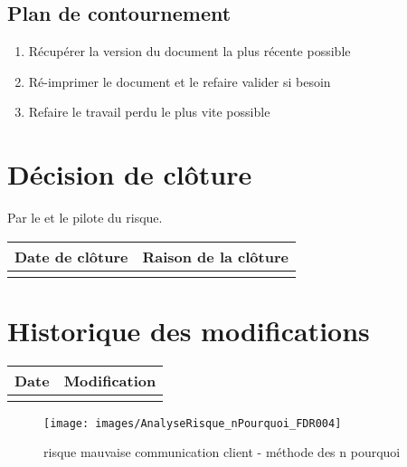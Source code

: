 \flushleft
\subsection*{Plan de contournement}

\begin{enumerate}
	\item Récupérer la version du document la plus récente possible
	\item Ré-imprimer le document et le refaire valider si besoin
	\item Refaire le travail perdu le plus vite possible
\end{enumerate}

\section*{Décision de clôture}
Par le \CP{} et le pilote du risque.
\begin{table}[H]
\centering
	\begin{tabularx}{16.8cm}{|X|X|}
	\hline
	\rowcolor{gray!40} Date de clôture & Raison de la clôture \\
	\hline
	  & \\
	\hline
	\end{tabularx}
\end{table}

\section*{Historique des modifications}
\begin{table}[H]
\centering
	\begin{tabularx}{16.8cm}{|X|X|}
	\hline
	Date & Modification \\
	\hline
	  & \\
	\hline
	\end{tabularx}
\end{table}
\newpage

\begin{landscape}
\begin{figure}
	\centering
	\texttt{[image: images/AnalyseRisque\_nPourquoi\_FDR004]}
	\caption{\label{risque mauvaise communication client}risque mauvaise communication client - méthode des n pourquoi}
\end{figure}
\end{landscape}